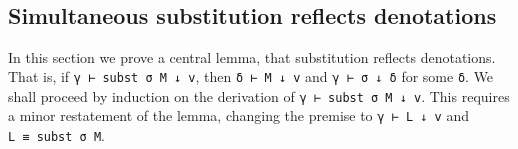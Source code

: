 \begin{fence}
\begin{code}%
\>[0]\AgdaSpace{}%
\AgdaSymbol{:}\AgdaSpace{}%
\AgdaSpace{}%
\AgdaSymbol{\{}\AgdaSymbol{\}}\AgdaSpace{}%
\AgdaSymbol{\{}\AgdaSpace{}%
\AgdaSpace{}%
\AgdaSymbol{:}\AgdaSpace{}%
\AgdaSpace{}%
\AgdaOperator{\AgdaInductiveConstructor{,}}\AgdaSpace{}%
\AgdaSpace{}%
\AgdaSpace{}%
\AgdaSpace{}%
\AgdaSymbol{\}}\<%
\\
\>[0][@{}l@{\AgdaIndent{0}}]%
\>[2]%
\>[1004I]\AgdaSpace{}%
\AgdaSymbol{\{}\AgdaSpace{}%
\AgdaSymbol{=}\AgdaSpace{}%
\AgdaSpace{}%
\AgdaSpace{}%
\AgdaSymbol{\}}\AgdaSpace{}%
\AgdaSymbol{(}\AgdaSpace{}%
\AgdaSymbol{)}\AgdaSpace{}%
\AgdaSymbol{(}\AgdaSpace{}%
\AgdaSymbol{)}\<%
\\
\>[.][@{}l@{}]\<[1004I]%
\>[4]\AgdaComment{---------------------------}\<%
\\
%
\>[2]\AgdaSpace{}%
\AgdaSpace{}%
\AgdaSpace{}%
\<%
\\
\>[0]\AgdaSpace{}%
\AgdaSpace{}%
\AgdaSymbol{=}\AgdaSpace{}%
\<%
\end{code}
\end{fence}

\hypertarget{simultaneous-substitution-reflects-denotations}{%
\subsection{Simultaneous substitution reflects
denotations}\label{simultaneous-substitution-reflects-denotations}}

In this section we prove a central lemma, that substitution reflects
denotations. That is, if \texttt{γ\ ⊢\ subst\ σ\ M\ ↓\ v}, then
\texttt{δ\ ⊢\ M\ ↓\ v} and \texttt{γ\ ⊢\ σ\ ↓\ δ} for some \texttt{δ}.
We shall proceed by induction on the derivation of
\texttt{γ\ ⊢\ subst\ σ\ M\ ↓\ v}. This requires a minor restatement of
the lemma, changing the premise to \texttt{γ\ ⊢\ L\ ↓\ v} and
\texttt{L\ ≡\ subst\ σ\ M}.

